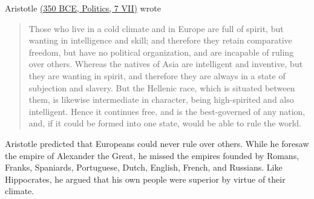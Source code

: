 Aristotle \href{http://classics.mit.edu/Aristotle/politics.7.seven.html}{(350 BCE, Politics, 7 VII)} wrote
\begin{quote}
    Those who live in a cold climate and in Europe are full of spirit, but wanting in intelligence and skill; and therefore they retain comparative freedom, but have no political organization, and are incapable of ruling over others. Whereas the natives of Asia are intelligent and inventive, but they are wanting in spirit, and therefore they are always in a state of subjection and slavery. But the Hellenic race, which is situated between them, is likewise intermediate in character, being high-spirited and also intelligent. Hence it continues free, and is the best-governed of any nation, and, if it could be formed into one state, would be able to rule the world.
\end{quote}
Aristotle predicted that Europeans could never rule over others. While he foresaw the empire of Alexander the Great, he missed the empires founded by Romans, Franks, Spaniards, Portuguese, Dutch, English, French, and Russians. Like Hippocrates, he argued that his own people were superior by virtue of their climate.

